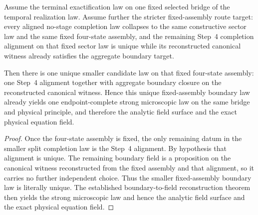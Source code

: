 \begin{theorem}
\label{thm:canonical-completion-boundary-law-target}
Assume the terminal exactification law on one fixed selected bridge of the
temporal realization law. Assume further the stricter fixed-assembly route
target: every aligned no-stage completion law collapses to the same
constructive sector law and the same fixed four-state assembly, and the
remaining Step~4 completion alignment on that fixed sector law is unique while
its reconstructed canonical witness already satisfies the aggregate boundary
target.

Then there is one unique smaller candidate law on that fixed four-state
assembly: one Step~4 alignment together with aggregate boundary closure on the
reconstructed canonical witness. Hence this unique fixed-assembly boundary law
already yields one endpoint-complete strong microscopic law on the same bridge
and physical principle, and therefore the analytic field surface and the exact
physical equation field.
\end{theorem}

\begin{proof}
Once the four-state assembly is fixed, the only remaining datum in
the smaller split completion law is the Step~4 alignment. By hypothesis that
alignment is unique. The remaining boundary field is a proposition on the
canonical witness reconstructed from the fixed assembly and that alignment, so
it carries no further independent choice. Thus the smaller fixed-assembly
boundary law is literally unique. The established boundary-to-field
reconstruction theorem then yields the strong microscopic law and hence the
analytic field surface and the exact physical equation field.
\end{proof}

